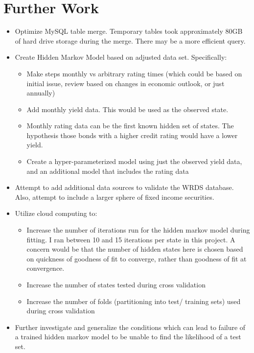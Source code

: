 \documentclass[a4paper, 11pt]{article}
\begin{document}
\section{Further Work}

\begin{itemize}\small
	\item Optimize MySQL table merge. Temporary tables took approximately 80GB of hard drive storage during the merge. There may be a more efficient query.
	\item Create Hidden Markov Model based on adjusted data set. Specifically:
	\begin{itemize}
		\item Make steps monthly vs arbitrary rating times (which could be based on initial issue, review based on changes in economic outlook, or just annually)
		\item Add monthly yield data. This would be used as the observed state.
		\item Monthly rating data can be the first known hidden set of states. The hypothesis those bonds with a higher credit rating would have a lower yield.
		\item Create a hyper-parameterized model using just the observed yield data, and an additional model that includes the rating data
		\end{itemize}
	\item Attempt to add additional data sources to validate the WRDS database. Also, attempt to include a larger sphere of fixed income securities.
	\item Utilize cloud computing to:
	\begin{itemize}
		\item Increase the number of iterations run for the hidden markov model during fitting. I ran between 10 and 15 iterations per state in this project. A concern would be that the number of hidden states here is chosen based on quickness of goodness of fit to converge, rather than goodness of fit at convergence.
		\item Increase the number of states tested during cross validation
		\item Increase the number of folds (partitioning into test/ training sets) used during cross validation
		\end{itemize}
	\item Further investigate and generalize the conditions which can lead to failure of a trained hidden markov model to be unable to find the likelihood of a test set.

	
\end{itemize}
\end{document}
